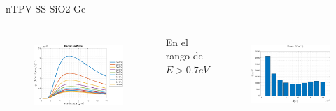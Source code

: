 \documentclass[spanish,a4paper]{beamer}%
\begin{document}
\begin{frame}{nTPV SS-SiO2-Ge}
{\begin{columns}
\begin{figure}[h]
										\includegraphics[width=\columnwidth]{SsGe}
								\label{fig:SsSiO2Ge_rad}%
						\end{figure}
						\vfill
					\vspace{-10pt}
						\begin{block}{\centering En el rango de $E>0.7eV$}
							\end{block}
					\vspace{10pt}
						\begin{figure}[h]%
								\centering
										\includegraphics[width=\columnwidth]{p_Eg_SsGe}%
								\label{fig:SsSiO2Ge_radInt}%
						\end{figure}
						\vfill
				\end{columns}		
		}	
\end{frame}
\end{document}
